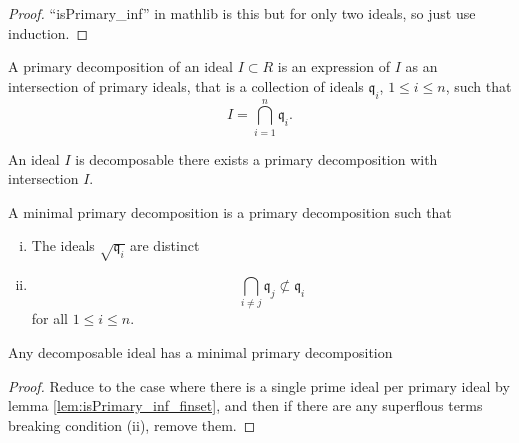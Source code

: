 \begin{proof}
    ``isPrimary_inf'' in mathlib is this but for only two ideals,
    so just use induction.
\end{proof}

\begin{definition}
    \label{def:primary_decomp}
    A primary decomposition of an ideal \(I \subset R\) is
    an expression of \(I\) as an intersection of primary ideals,
    that is a collection of ideals
    \(\mathfrak{q}_{i}\), \(1 \leq i \leq n\),
    such that
    \[
    I = \bigcap_{i=1}^{n} \mathfrak{q}_{i} 
    .\]
\end{definition}

\begin{definition}
    \label{def:decomposable}
    An ideal \(I\) is decomposable there exists a primary decomposition
    with intersection \(I\).
\end{definition}

\begin{definition}
    \label{def:minimal_primary_decomp}
    A minimal primary decomposition is a primary decomposition such that
    \begin{enumerate}[(i)]
        \item The ideals \(\sqrt{\mathfrak{q}_{i}}\) are distinct
        \item
            \[
            \bigcap_{i \neq j}^{} \mathfrak{q}_{j} \not\subset \mathfrak{q}_{i} 
            \]
            for all \(1 \leq i \leq n\).
    \end{enumerate}
\end{definition}


\begin{lemma}
    \label{lem:has_minimal_primary_decomp_of_decomposable}
    Any decomposable ideal has a minimal primary decomposition
\end{lemma}

\begin{proof}
    Reduce to the case where there is a single prime ideal per
    primary ideal by lemma \ref{lem:isPrimary_inf_finset},
    and then if there are any superflous terms breaking condition
    (ii), remove them.
\end{proof}


\begin{theorem}
    \label{thm:first_uniqueness_primary_decomposition}

\end{theorem}

